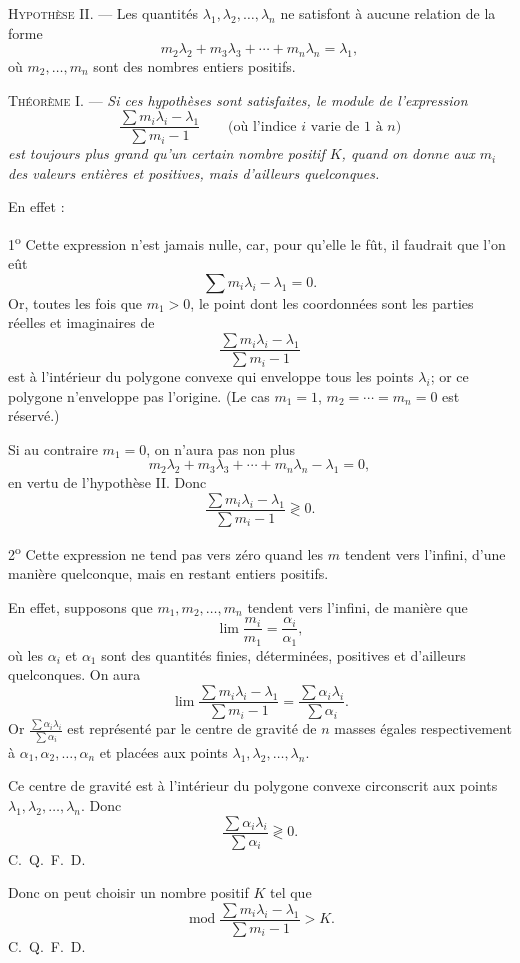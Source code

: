 \documentclass[11pt]{article}
\begin{document}
\noindent\textsc{Hypothèse II.} --- Les quantités $\lambda_1,\lambda_2,\ldots,\lambda_n$ ne satisfont à aucune relation de la forme
\[
m_2\lambda_2+m_3\lambda_3+\cdots+m_n\lambda_n=\lambda_1,
\]
où $m_2,\ldots,m_n$ sont des nombres entiers positifs.

\noindent\textsc{Théorème I.} --- \emph{Si ces hypothèses sont satisfaites, le module de l’expression}
\[
\frac{\sum m_i\lambda_i-\lambda_1}{\sum m_i-1}
\qquad\text{(où l’indice $i$ varie de $1$ à $n$)}
\]
\emph{est toujours plus grand qu’un certain nombre positif $K$, quand on donne aux $m_i$ des valeurs entières et positives, mais d’ailleurs quelconques.}

En effet :

1\textsuperscript{o} Cette expression n’est jamais nulle, car, pour qu’elle le fût, il faudrait que l’on eût
\[
\sum m_i\lambda_i-\lambda_1=0.
\]
Or, toutes les fois que $m_1>0$, le point dont les coordonnées sont les parties réelles et imaginaires de
\[
\frac{\sum m_i\lambda_i-\lambda_1}{\sum m_i-1}
\]
est à l’intérieur du polygone convexe qui enveloppe tous les points $\lambda_i$; or ce polygone n’enveloppe pas l’origine. (Le cas $m_1=1$, $m_2=\cdots=m_n=0$ est réservé.)

Si au contraire $m_1=0$, on n’aura pas non plus
\[
m_2\lambda_2+m_3\lambda_3+\cdots+m_n\lambda_n-\lambda_1=0,
\]
en vertu de l’hypothèse II. Donc
\[
\frac{\sum m_i\lambda_i-\lambda_1}{\sum m_i-1} \gtrless 0.
\]

2\textsuperscript{o} Cette expression ne tend pas vers zéro quand les $m$ tendent vers l’infini, d’une manière quelconque, mais en restant entiers positifs.

En effet, supposons que $m_1,m_2,\ldots,m_n$ tendent vers l’infini, de manière que
\[
\lim\frac{m_i}{m_1}=\frac{\alpha_i}{\alpha_1},
\]
où les $\alpha_i$ et $\alpha_1$ sont des quantités finies, déterminées, positives et d’ailleurs quelconques. On aura
\[
\lim\frac{\sum m_i\lambda_i-\lambda_1}{\sum m_i-1}
=
\frac{\sum \alpha_i\lambda_i}{\sum \alpha_i}.
\]
Or $\frac{\sum \alpha_i\lambda_i}{\sum \alpha_i}$ est représenté par le centre de gravité de $n$ masses égales respectivement à $\alpha_1,\alpha_2,\ldots,\alpha_n$ et placées aux points $\lambda_1,\lambda_2,\ldots,\lambda_n$.

Ce centre de gravité est à l’intérieur du polygone convexe circonscrit aux points $\lambda_1,\lambda_2,\ldots,\lambda_n$. Donc
\[
\frac{\sum \alpha_i\lambda_i}{\sum \alpha_i} \gtrless 0.
\]
\hfill\mbox{C. Q. F. D.}

Donc on peut choisir un nombre positif $K$ tel que
\[
\operatorname{mod}\frac{\sum m_i\lambda_i-\lambda_1}{\sum m_i-1}>K.
\]
\hfill\mbox{C. Q. F. D.}
\end{document}
